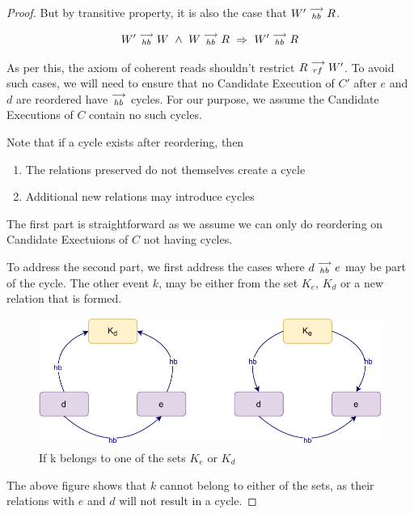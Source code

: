 \begin{proof}
        But by transitive property, it is also the case that $W'\stackrel{\longrightarrow}{_{hb}}R$. 
        
        \[
            \reln{W'}{hb}{W} \ \wedge \ \reln{W}{hb}{R} \ 
            \Rightarrow \ 
            \reln{W'}{hb}{R}
        \]
        
        As per this, the axiom of coherent reads shouldn't restrict $R\stackrel{\longrightarrow}{_{rf}}W'$. To avoid such cases, we will need to ensure that no Candidate Execution of $C'$ after $e$ and $d$ are reordered have $\stackrel{\longrightarrow}{_{hb}}$ cycles. For our purpose, we assume the Candidate Executions of $C$ contain no such cycles. 
        
        Note that if a cycle exists after reordering, then 
        \begin{enumerate}
            \item The relations preserved do not themselves create a cycle
            \item Additional new relations may introduce cycles
        \end{enumerate}
       
        The first part is straightforward as we assume we can only do reordering on Candidate Exectuions of $C$ not having cycles. 
        
        To address the second part, we first address the cases where $d\stackrel{\longrightarrow}{_{hb}}e$ may be part of the cycle. The other event $k$, may be either from the set $K_e$, $K_d$ or a new relation that is formed.
        
        \begin{figure}[H]
            \centering
            \includegraphics[scale=0.7]{Q4(a)_1.pdf}
            \caption{If k belongs to one of the sets $K_e$ or $K_d$}
            \label{fig:my_label}
        \end{figure}
        
        The above figure shows that $k$ cannot belong to either of the sets, as their relations with $e$ and $d$ will not result in a cycle. 
        

\end{proof}
